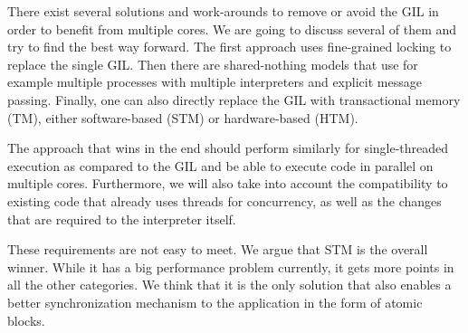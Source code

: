 \documentclass{sigplanconf}
\begin{document}
There exist several solutions and work-arounds to remove or avoid the
GIL in order to benefit from multiple cores. We are going to discuss
several of them and try to find the best way forward. The first
approach uses fine-grained locking to replace the single GIL. Then
there are shared-nothing models that use for example multiple
processes with multiple interpreters and explicit message
passing. Finally, one can also directly replace the GIL with
transactional memory (TM), either software-based (STM) or
hardware-based (HTM).

The approach that wins in the end should perform similarly for
single-threaded execution as compared to the GIL and be able to
execute code in parallel on multiple cores. Furthermore, we will also
take into account the compatibility to existing code that already uses
threads for concurrency, as well as the changes that are required to
the interpreter itself.

These requirements are not easy to meet. We argue that STM is the
overall winner. While it has a big performance problem currently, it
gets more points in all the other categories. We think that it is the
only solution that also enables a better synchronization mechanism to
the application in the form of atomic blocks.





\end{document}

